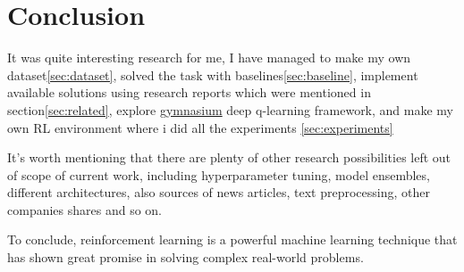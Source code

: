 \documentclass{article}
\begin{document}
\section{Conclusion}
It was quite interesting research for me, I have managed to make my own dataset\ref{sec:dataset}, solved the task with baselines\ref{sec:baseline}, implement available solutions using research reports which were mentioned in section\ref{sec:related}, explore \href{https://pypi.org/project/gymnasium/}{gymnasium}  deep q-learning framework, and make my own RL environment where i did all the experiments \ref{sec:experiments}

It's worth mentioning that there are plenty of other research possibilities left out of scope of current work, including hyperparameter tuning, model ensembles, different architectures, also sources of news articles, text preprocessing, other companies shares and so on.

To conclude, reinforcement learning is a powerful machine learning technique that has shown great promise in solving complex real-world problems.



\end{document}
